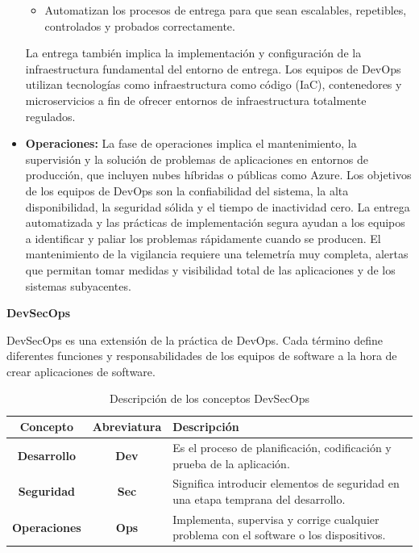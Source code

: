 \begin{itemize}
\begin{itemize}
            \item Automatizan los procesos de entrega para que sean escalables, repetibles, controlados y probados correctamente.
        \end{itemize}
    La entrega también implica la implementación y configuración de la infraestructura fundamental del entorno de entrega. Los equipos de DevOps utilizan tecnologías como infraestructura como código (IaC), contenedores y microservicios a fin de ofrecer entornos de infraestructura totalmente regulados.
    \item \textbf{Operaciones: }La fase de operaciones implica el mantenimiento, la supervisión y la solución de problemas de aplicaciones en entornos de producción, que incluyen nubes híbridas o públicas como Azure. Los objetivos de los equipos de DevOps son la confiabilidad del sistema, la alta disponibilidad, la seguridad sólida y el tiempo de inactividad cero.
    La entrega automatizada y las prácticas de implementación segura ayudan a los equipos a identificar y paliar los problemas rápidamente cuando se producen. El mantenimiento de la vigilancia requiere una telemetría muy completa, alertas que permitan tomar medidas y visibilidad total de las aplicaciones y de los sistemas subyacentes.\cite{MicrosoftLearnDevOps}
\end{itemize}

\textbf{DevSecOps}

DevSecOps es una extensión de la práctica de DevOps. Cada término define diferentes funciones y responsabilidades de los equipos de software a la hora de crear aplicaciones de software.

\begin{table}[ht]
\centering
\begin{tabular}{|c|c|p{9cm}|}
\hline
\textbf{Concepto} & \textbf{Abreviatura} & \textbf{Descripción} \\ \hline
\textbf{Desarrollo} & \textbf{Dev} & Es el proceso de planificación, codificación y prueba de la aplicación. \\ \hline
\textbf{Seguridad} & \textbf{Sec} & Significa introducir elementos de seguridad en una etapa temprana del desarrollo. \\ \hline
\textbf{Operaciones} & \textbf{Ops} & Implementa, supervisa y corrige cualquier problema con el software o los dispositivos. \\ \hline
\end{tabular}
\caption{Descripción de los conceptos DevSecOps}
\end{table}

